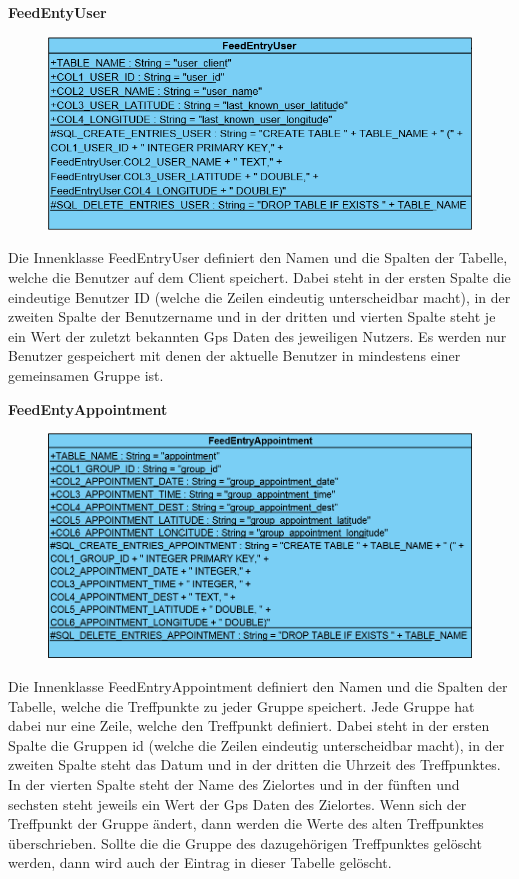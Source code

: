 \textbf{FeedEntyUser}
\begin{figure}[H]
	\includegraphics[scale = .6]{res/umlClasses/FeedEntryUser.png}
	\centering
\end{figure}
Die Innenklasse FeedEntryUser definiert den Namen und die Spalten der Tabelle, welche die Benutzer auf dem Client speichert. 
Dabei steht in der ersten Spalte die eindeutige Benutzer ID (welche die Zeilen eindeutig unterscheidbar macht), in der zweiten Spalte der Benutzername und in der dritten und vierten Spalte steht je ein Wert der zuletzt bekannten Gps Daten des jeweiligen Nutzers. 
Es werden nur Benutzer gespeichert mit denen der aktuelle Benutzer in mindestens einer gemeinsamen Gruppe ist.

\textbf{FeedEntyAppointment}
\begin{figure}[H]
	\includegraphics[scale = .5]{res/umlClasses/FeedEntryAppointment.png}
	\centering
\end{figure}
Die Innenklasse FeedEntryAppointment definiert den Namen und die Spalten der Tabelle, welche die Treffpunkte zu jeder Gruppe speichert. Jede Gruppe hat dabei nur eine Zeile, welche den Treffpunkt definiert. 
Dabei steht in der ersten Spalte die Gruppen id (welche die Zeilen eindeutig unterscheidbar macht), in der zweiten Spalte steht das Datum und in der dritten die Uhrzeit des Treffpunktes. In der vierten Spalte steht der Name des Zielortes und in der fünften und sechsten steht jeweils ein Wert der Gps Daten des Zielortes. 
Wenn sich der Treffpunkt der Gruppe ändert, dann werden die Werte des alten Treffpunktes überschrieben.
Sollte die die Gruppe des dazugehörigen Treffpunktes gelöscht werden, dann wird auch der Eintrag in dieser Tabelle gelöscht.


